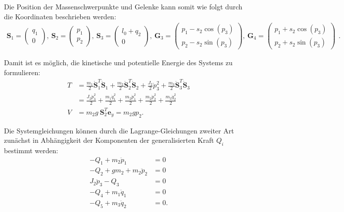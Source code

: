 Die Position der Massenschwerpunkte und Gelenke kann somit wie folgt durch die Koordinaten beschrieben werden:
\begin{equation}
\begin{smallmatrix}
\mathbf{S}_1 =
\begin{pmatrix}
q_1 \\
0
\end{pmatrix}, 
\
\mathbf{S}_2 =
\begin{pmatrix}
p_1 \\
p_2
\end{pmatrix},
\
\mathbf{S}_3 =
\begin{pmatrix}
l_0 + q_2 \\
0
\end{pmatrix},
\
\mathbf{G}_3 =
\left(\begin{matrix}
p_{1} - s_{2} \cos{\left(p_{3} \right)}\\
p_{2} - s_{2} \sin{\left(p_{3} \right)}
\end{matrix}\right),
\
\mathbf{G}_4 =
\left(\begin{matrix}
p_{1} + s_{2} \cos{\left(p_{3} \right)}\\
p_{2} + s_{2} \sin{\left(p_{3} \right)}
\end{matrix}\right)
\end{smallmatrix}.
\end{equation}

Damit ist es möglich, die kinetische und potentielle Energie des Systems zu formulieren:
\begin{align}
T &= \frac{m_1}{2} \dot{\mathbf{S}}_1^T \dot{\mathbf{S}}_1 + \frac{m_2}{2} \dot{\mathbf{S}}_2^T \dot{\mathbf{S}}_2 + \frac{J_2}{2} \dot{p}_3^2 + \frac{m_3}{2} \dot{\mathbf{S}}_3^T \dot{\mathbf{S}}_3 \nonumber \\  
&= \frac{J_{2} \dot{p}_{3}^{2}}{2} + \frac{m_{1} \dot{q}_{1}^{2}}{2} + \frac{m_{2} \dot{p}_{1}^{2}}{2} + \frac{m_{2} \dot{p}_{2}^{2}}{2} + \frac{m_{3} \dot{q}_{2}^{2}}{2} \\
V &= m_2 g \ \mathbf{S}_2^T \mathbf{e}_y = m_{2} g p_{2}.
\end{align}

Die Systemgleichungen können durch die Lagrange-Gleichungen zweiter Art zunächst in Abhängigkeit der Komponenten der generalisierten Kraft $Q_i$ bestimmt werden:
\begin{subequations}
	\begin{align}
	- Q_{1} + m_{2} \ddot{p}_{1} &= 0\\
	- Q_{2} + g m_{2} + m_{2} \ddot{p}_{2} &= 0\\
	J_{2} \ddot{p}_{3} - Q_{3} &= 0\\
	- Q_{4} + m_{1} \ddot{q}_{1} &= 0\\
	- Q_{5} + m_{3} \ddot{q}_{2} &= 0.
	\end{align}
\end{subequations}

